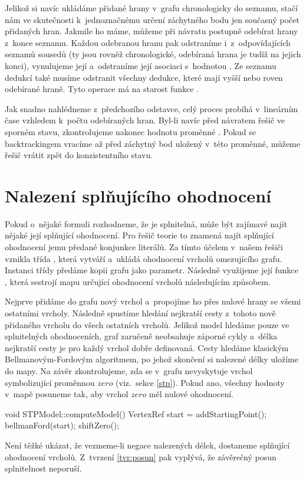 Jelikož si navíc ukládáme přidané hrany v~grafu chronologicky do seznamu, stačí nám ve skutečnosti k~jednoznačnému určení záchytného bodu jen současný počet přidaných hran. Jakmile ho máme, můžeme při návratu postupně odebírat hrany z~konce seznamu. Každou odebranou hranu pak odstraníme i~z~odpovídajících seznamů sousedů (ty jsou rovněž chronologické, odebíraná hrana je tudíž na jejich konci), vynulujeme její  a~odstraníme její asociaci s~hodnotou . Ze seznamu dedukcí také musíme odstranit všechny dedukce, které mají  vyšší nebo roven odebírané hraně.  Tyto operace má na starost funkce . 

Jak snadno nahlédneme z~předchozího odstavce, celý proces probíhá v~lineárním čase vzhledem k~počtu odebíraných hran. Byl-li navíc před návratem řešič ve sporném stavu, zkontrolujeme nakonec hodnotu proměnné . Pokud se backtrackingem vracíme až před záchytný bod uložený v~této proměnné, můžeme řešič vrátit zpět do konzistentního stavu.

\section{Nalezení splňujícího ohodnocení}

Pokud o~nějaké formuli rozhodneme, že je splnitelná, může být zajímavé najít nějaké její splňující ohodnocení. Pro řešič teorie to znamená najít splňující ohodnocení jemu předané konjunkce literálů. Za tímto účelem v~našem řešiči vznikla třída , která vytváří a~ukládá ohodnocení vrcholů omezujícího grafu. Instanci třídy předáme kopii grafu jako parametr. Následně využijeme její funkce , která sestrojí mapu určující ohodnocení vrcholů následujícím způsobem.

Nejprve přidáme do grafu nový vrchol a~propojíme ho přes nulové hrany se všemi ostatními vrcholy. Následně spustíme hledání nejkratší cesty z~tohoto nově přidaného vrcholu do všech ostatních vrcholů. Jelikož model hledáme pouze ve splnitelných ohodnoceních, graf zaručeně neobsahuje záporné cykly a~délka nejkratší cesty je pro každý vrchol dobře definovaná. Cesty hledáme klasickým Bellmanovým-Fordovým algoritmem, po jehož skončení si nalezené délky uložíme do mapy. Na závěr zkontrolujeme, zda se v~grafu nevyskytuje vrchol symbolizující proměnnou $zero$ (viz.~sekce \ref{stp}). Pokud ano, všechny hodnoty v~mapě posuneme tak, aby vrchol $zero$ měl nulové ohodnocení.
\begin{code}
void STPModel::computeModel() {
	VertexRef start = addStartingPoint();
	bellmanFord(start);
	shiftZero();
}
\end{code}
Není těžké ukázat, že vezmeme-li negace nalezených délek, dostaneme splňující ohodnocení vrcholů. Z~tvrzení \ref{tvr:posun} pak vyplývá, že závěrečný posun splnitelnost neporuší.

